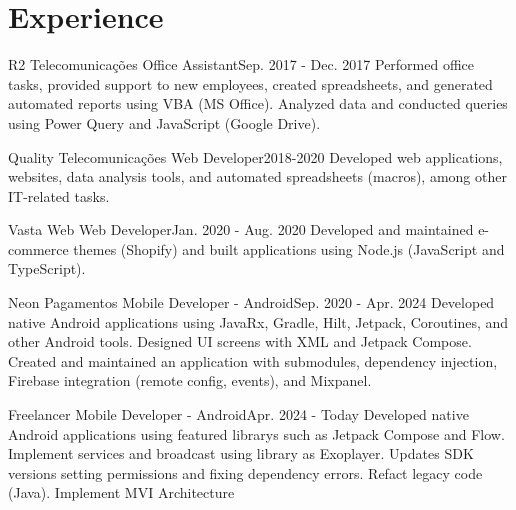 \section{Experience}
  \resumeSubHeadingListStart

    \resumeSubheading
      {R2 Telecomunicações}{}
      {Office Assistant}{Sep. 2017 - Dec. 2017}
      \resumeItemListStart
          {Performed office tasks, provided support to new employees, created spreadsheets, and generated automated reports using VBA (MS Office). Analyzed data and conducted queries using Power Query and JavaScript (Google Drive).}
      \resumeItemListEnd

    \resumeSubheading
      {Quality Telecomunicações}{}
      {Web Developer}{2018-2020}
      \resumeItemListStart
          {Developed web applications, websites, data analysis tools, and automated spreadsheets (macros), among other IT-related tasks.}
      \resumeItemListEnd

    \resumeSubheading
      {Vasta Web}{}
      {Web Developer}{Jan. 2020 - Aug. 2020}
      \resumeItemListStart
          {Developed and maintained e-commerce themes (Shopify) and built applications using Node.js (JavaScript and TypeScript).}
      \resumeItemListEnd

    \resumeSubheading
      {Neon Pagamentos}{}
      {Mobile Developer - Android}{Sep. 2020 - Apr. 2024}
      \resumeItemListStart
          {Developed native Android applications using JavaRx, Gradle, Hilt, Jetpack, Coroutines, and other Android tools. Designed UI screens with XML and Jetpack Compose. Created and maintained an application with submodules, dependency injection, Firebase integration (remote config, events), and Mixpanel.}
      \resumeItemListEnd

    \resumeSubheading
      {Freelancer}{}
      {Mobile Developer - Android}{Apr. 2024 - Today}
      \resumeItemListStart
          {Developed native Android applications using featured librarys such as Jetpack Compose and Flow. Implement services and broadcast using library as Exoplayer. Updates SDK versions setting permissions and fixing dependency errors. Refact legacy code (Java). Implement MVI Architecture}
      \resumeItemListEnd

  \resumeSubHeadingListEnd